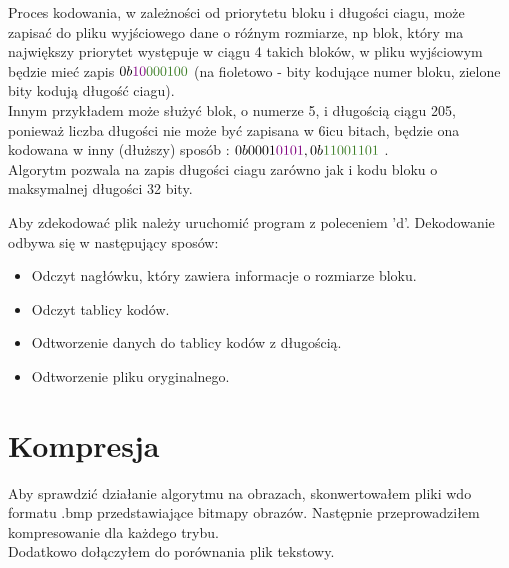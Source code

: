 \documentclass{article}
\begin{document}
\par
Proces kodowania, w zależności od priorytetu bloku i długości ciagu, może zapisać do pliku wyjściowego dane o róźnym rozmiarze, np blok, który ma największy priorytet występuje w ciągu 4 takich bloków, w pliku wyjściowym będzie mieć zapis \( 0b \textcolor{violet}{10}  \textcolor{OliveGreen}{00 01 00}\) (na fioletowo - bity kodujące numer bloku, zielone bity kodują długość ciagu). \\
Innym przykładem może służyć blok, o numerze 5, i długością ciągu 205, ponieważ liczba długości nie może być zapisana w 6icu bitach, będzie ona kodowana w inny (dłuższy) sposób :  \( 0b 0001 \textcolor{violet}{0101} ,    0b \textcolor{OliveGreen}{11001101} \) . \\
Algorytm pozwala na zapis długości ciagu zarówno jak i kodu bloku o maksymalnej długości 32 bity. \\
\par
Aby zdekodować plik należy uruchomić program z poleceniem 'd'. Dekodowanie odbywa się w następujący sposów:
\begin{itemize} 
	\item Odczyt nagłówku, który zawiera informacje o rozmiarze bloku.
	\item Odczyt tablicy kodów.
	\item Odtworzenie danych do tablicy kodów z długością.
	\item Odtworzenie pliku oryginalnego.
\end{itemize}


\pagebreak
\section{Kompresja}
Aby sprawdzić działanie algorytmu na obrazach, skonwertowałem pliki wdo formatu .bmp przedstawiające bitmapy obrazów. Następnie przeprowadziłem kompresowanie dla każdego trybu. \\
Dodatkowo dołączyłem do porównania plik tekstowy.
\end{document}
